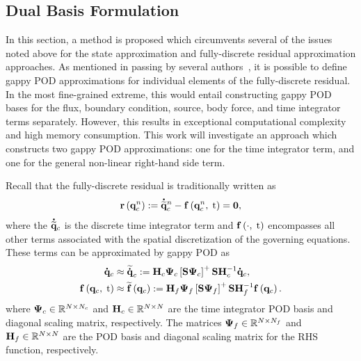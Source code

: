 \subsection{Dual Basis Formulation}\label{subsec:dualBasis}

In this section, a method is proposed which circumvents several of the issues noted above for the state approximation and fully-discrete residual approximation approaches. As mentioned in passing by several authors~\cite{Tezaur2017,Grimberg2021}, it is possible to define gappy POD approximations for individual elements of the fully-discrete residual. In the most fine-grained extreme, this would entail constructing gappy POD bases for the flux, boundary condition, source, body force, and time integrator terms separately. However, this results in exceptional computational complexity and high memory consumption. This work will investigate an approach which constructs two gappy POD approximations: one for the time integrator term, and one for the general non-linear right-hand side term.

Recall that the fully-discrete residual is traditionally written as
%
\begin{equation}
    \mathbf{r}\left(\mathbf{q}_{c}^{n}\right) := \accentset{\mbox{\large\bfseries .}}{\mathbf{\widetilde{q}}}_{c}^{n} - \mathbf{f} \left(\mathbf{q}_{c}^{n}, \; \text{t}\right) = \mathbf{0},
\end{equation}
%
where the $\accentset{\mbox{\large\bfseries .}}{\mathbf{\widetilde{q}}}_{c}$ is the discrete time integrator term and $\mathbf{f} \left(\cdot, \; \text{t}\right)$ encompasses all other terms associated with the spatial discretization of the governing equations. These terms can be approximated by gappy POD as
%
\begin{align}
	\consVecDt &\approx \consVecDtApprox \defEq \consScale \deimRegressorCons \consScaleInv \consVecDt, \label{eq:consvApprox} \\
	\rhsFunc{\consVec, \; \timeVar} &\approx \rhsApproxFunc{\consVec} \defEq \rhsScale \deimRegressorRhs \rhsScaleInv \rhsFunc{\consVec}. \label{eq:rhsApprox}
\end{align}
%
where $\deimBasisCons \inRTwo{\numDOF}{\numConsModes}$ and $\consScale \inRTwo{\numDOF}{\numDOF}$ are the time integrator POD basis and diagonal scaling matrix, respectively. The matrices $\deimBasisRhs \inRTwo{\numDOF}{\numRHSModes}$ and $\rhsScale \inRTwo{\numDOF}{\numDOF}$ are the POD basis and diagonal scaling matrix for the RHS function, respectively. 

